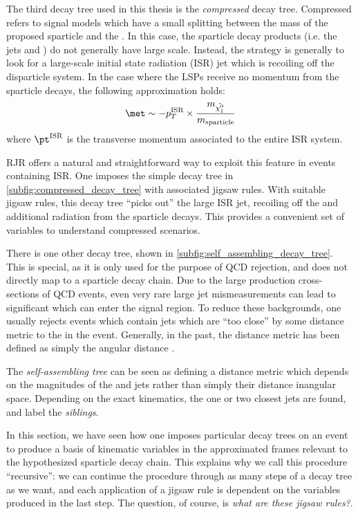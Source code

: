 The third decay tree used in this thesis is the \textit{compressed} decay tree.
Compressed refers to signal models which have a small splitting between the mass of the proposed sparticle and the \lsp.
In this case, the sparticle decay products (i.e. the jets and \met) do not generally have large scale\cite{Jackson:2016mfb}.
Instead, the strategy is generally to look for a large-scale initial state radiation (ISR) jet which is recoiling off the disparticle system.
In the case where the LSPs receive no momentum from the sparticle decays, the following approximation holds:
\begin{align}
\met \order -p_T^{\text{ISR}} \times \frac{m_{\lsp} }{m_{\text{sparticle}}}
\end{align}
where $\pt^{\text{ISR}}$ is the transverse momentum associated to the entire ISR system.

RJR offers a natural and straightforward way to exploit this feature in events containing ISR.
One imposes the simple decay tree in \ref{subfig:compressed_decay_tree} with associated jigsaw rules.
With suitable jigsaw rules, this decay tree ``picks out'' the large \pt ISR jet, recoiling off the \met and additional radiation from the sparticle decays.
This provides a convenient set of variables to understand compressed scenarios.

There is one other decay tree, shown in \ref{subfig:self_assembling_decay_tree}.
This is special, as it is only used for the purpose of QCD rejection, and does not directly map to a sparticle decay chain.
Due to the large production cross-sections of QCD events, even very rare large jet mismeasurements can lead to significant \met which can enter the signal region.
To reduce these backgrounds, one usually rejects events which contain jets which are ``too close'' by some distance metric to the \met in the event.
Generally, in the past, the distance metric has been defined as simply the angular distance \deltaR.

The \textit{self-assembling tree} can be seen as defining a distance metric which depends on the magnitudes of the \met and jets rather than simply their distance inangular space.
Depending on the exact kinematics, the one or two closest jets are found, and label the \met \textit{siblings}.

In this section, we have seen how one imposes particular decay trees on an event to produce a basis of kinematic variables in the approximated frames relevant to the hypothesized sparticle decay chain.
This explains why we call this procedure ``recursive'': we can continue the procedure through as many steps of a decay tree as we want, and each application of a jigsaw rule is dependent on the variables produced in the last step.
The question, of course, is \textit{what are these jigsaw rules?}.

